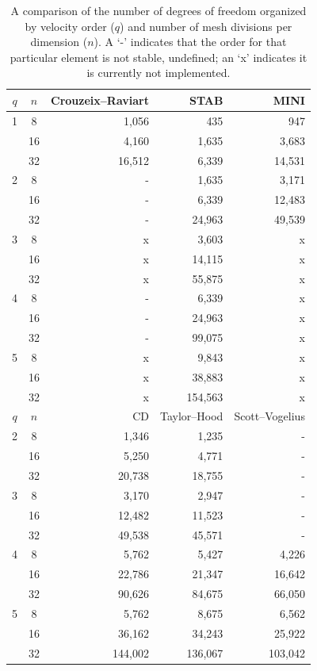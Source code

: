 \begin{table}
  \center
  \medskip
  \small
  \begin{tabular}{|cc|rrr|}
    \hline
    $q$ & $n$ & Crouzeix--Raviart & STAB & MINI \\
    \hline
    1&  8 &   1,056 &   435 & 947  \\
      & 16 &   4,160 & 1,635 & 3,683 \\
      & 32 & 16,512 & 6,339 & 14,531 \\
    \hline
    2 &  8 & - &     1,635 & 3,171 \\
       & 16 & - &    6,339 &  12,483 \\
       & 32 & - &  24,963 & 49,539 \\
    \hline
    3 &  8 & x &    3,603 & x \\
       & 16 & x & 14,115 & x \\
       & 32 & x & 55,875 & x \\
    \hline
    4 &  8 & - &    6,339 & x \\
       & 16 & - & 24,963 & x \\
       & 32 & - & 99,075 & x \\
    \hline
    5 &  8 & x &      9,843 &  x \\
       & 16 & x &   38,883 &  x \\
       & 32 & x & 154,563 & x \\
    \hline
    \hline
    $q$ & $n$ & CD & Taylor--Hood & Scott--Vogelius \\
    \hline
    2 &  8 &  1,346 &   1,235 & - \\
       & 16 &  5,250 &   4,771 & - \\
       & 32 & 20,738& 18,755 & - \\
    \hline
    3 &  8 &   3,170 &   2,947 & - \\
       & 16 & 12,482 & 11,523 & - \\
       & 32 & 49,538 & 45,571 & - \\
    \hline
    4 &  8 &   5,762 &    5,427 &   4,226 \\
       & 16 & 22,786 &  21,347 & 16,642 \\
       & 32 & 90,626 &  84,675 & 66,050 \\
    \hline
    5 &  8 &      5,762 &     8,675 &     6,562 \\
       & 16 &   36,162 &   34,243 &   25,922 \\
       & 32 & 144,002 & 136,067 & 103,042 \\
    \hline
\end{tabular}
  \caption{A comparison of the number of degrees of freedom organized
  by velocity order ($q$) and number of mesh divisions per dimension
  ($n$). A `-' indicates that the order for that particular element is
  not stable, undefined; an `x' indicates it is currently not
  implemented.}  \label{tab:terrel:DOFs}
\end{table}

